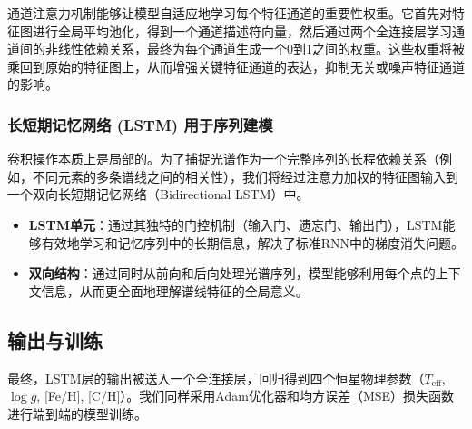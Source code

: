 通道注意力机制能够让模型自适应地学习每个特征通道的重要性权重。它首先对特征图进行全局平均池化，得到一个通道描述符向量，然后通过两个全连接层学习通道间的非线性依赖关系，最终为每个通道生成一个0到1之间的权重。这些权重将被乘回到原始的特征图上，从而增强关键特征通道的表达，抑制无关或噪声特征通道的影响。

\subsubsection{长短期记忆网络 (LSTM) 用于序列建模}
卷积操作本质上是局部的。为了捕捉光谱作为一个完整序列的长程依赖关系（例如，不同元素的多条谱线之间的相关性），我们将经过注意力加权的特征图输入到一个双向长短期记忆网络（Bidirectional LSTM）中。
\begin{itemize}
    \item \textbf{LSTM单元}：通过其独特的门控机制（输入门、遗忘门、输出门），LSTM能够有效地学习和记忆序列中的长期信息，解决了标准RNN中的梯度消失问题。
    \item \textbf{双向结构}：通过同时从前向和后向处理光谱序列，模型能够利用每个点的上下文信息，从而更全面地理解谱线特征的全局意义。
\end{itemize}

\subsection{输出与训练}
最终，LSTM层的输出被送入一个全连接层，回归得到四个恒星物理参数（$T_{\text{eff}}$, $\log g$, [Fe/H], [C/H]）。我们同样采用Adam优化器和均方误差（MSE）损失函数进行端到端的模型训练。